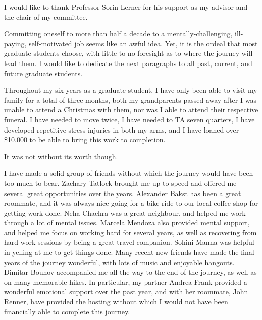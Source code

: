\documentclass[12pt]{ucsddissertation}
\begin{document}

\tableofcontents
\listoffigures
\listoftables


\begin{acknowledgements}
I would like to thank Professor Sorin Lerner for his support as my advisor and
the chair of my committee.

Committing oneself to more than half a decade to a mentally-challenging,
ill-paying, self-motivated job seems like an awful idea.  Yet, it is the ordeal
that most graduate students choose, with little to no foresight as to where the
journey will lead them.  I would like to dedicate the next paragraphs to all
past, current, and future graduate students.

Throughout my six years as a graduate student, I have only been able to visit my
family for a total of three months, both my grandparents passed away after I was
unable to attend a Christmas with them, nor was I able to attend their
respective funeral.  I have needed to move twice, I have needed to TA seven
quarters, I have developed repetitive stress injuries in both my arms, and I
have loaned over \$10.000 to be able to bring this work to completion.

It was not without its worth though.

I have made a solid group of friends without which the journey would have been
too much to bear.  Zachary Tatlock brought me up to speed and offered me several
great opportunities over the years.  Alexander Bakst has been a great roommate,
and it was always nice going for a bike ride to our local coffee shop for
getting work done.  Neha Chachra was a great neighbour, and helped me work
through a lot of mental issues.  Marcela Mendoza also provided mental support,
and helped me focus on working hard for several years, as well as recovering
from hard work sessions by being a great travel companion.  Sohini Manna was
helpful in yelling at me to get things done.  Many recent new friends have made
the final years of the journey wonderful, with lots of music and enjoyable
hangouts.  Dimitar Bounov accompanied me all the way to the end of the journey,
as well as on many memorable hikes.  In particular, my partner Andrea Frank
provided a wonderful emotional support over the past year, and with her
roommate, John Renner, have provided the hosting without which I would not have
been financially able to complete this journey.


\end{acknowledgements}
\end{document}
